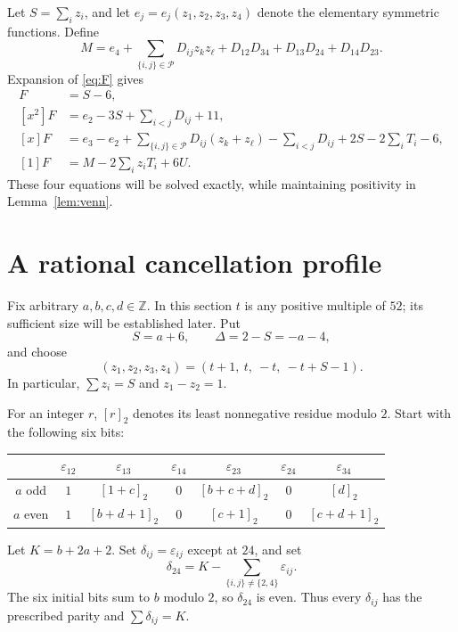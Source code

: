\documentclass[11pt,a4paper]{article}
\theoremstyle{definition}
\newcommand{\Z}{\mathbb Z}
\newcommand{\pairs}{\mathcal P}
\newcommand{\bit}[1]{[#1]_2}
\begin{document}
Let $S=\sum_i z_i$, and let $e_j=e_j(z_1,z_2,z_3,z_4)$ denote the
elementary symmetric functions. Define
\begin{equation}\label{eq:M}
 M=e_4+\sum_{\{i,j\}\in\pairs}D_{ij}z_kz_\ell
     +D_{12}D_{34}+D_{13}D_{24}+D_{14}D_{23}.
\end{equation}
Expansion of \eqref{eq:F} gives
\begin{align}
 [x^3]F&=S-6,\label{eq:coef3}\\
 [x^2]F&=e_2-3S+\sum_{i<j}D_{ij}+11,\label{eq:coef2}\\
 [x]F&=e_3-e_2+\sum_{\{i,j\}\in\pairs}D_{ij}(z_k+z_\ell)
       -\sum_{i<j}D_{ij}+2S-2\sum_iT_i-6,\label{eq:coef1}\\
 [1]F&=M-2\sum_i z_iT_i+6U.\label{eq:coef0}
\end{align}
These four equations will be solved exactly, while maintaining positivity
in Lemma~\ref{lem:venn}.

\section{A rational cancellation profile}\label{sec:construction}

Fix arbitrary $a,b,c,d\in\Z$. In this section $t$ is any positive
multiple of $52$; its sufficient size will be established later. Put
\begin{equation}\label{eq:Sdelta}
 S=a+6,\qquad \Delta=2-S=-a-4,
\end{equation}
and choose
\begin{equation}\label{eq:z}
 (z_1,z_2,z_3,z_4)=(t+1,\ t,\ -t,\ -t+S-1).
\end{equation}
In particular, $\sum z_i=S$ and $z_1-z_2=1$.

For an integer $r$, $\bit r$ denotes its least nonnegative residue modulo
$2$. Start with the following six bits:
\begin{center}
\begin{tabular}{c cccccc}
\toprule
 & $\varepsilon_{12}$ & $\varepsilon_{13}$ & $\varepsilon_{14}$
 & $\varepsilon_{23}$ & $\varepsilon_{24}$ & $\varepsilon_{34}$\\
\midrule
$a$ odd & $1$ & $\bit{1+c}$ & $0$ & $\bit{b+c+d}$ & $0$ & $\bit d$\\
$a$ even & $1$ & $\bit{b+d+1}$ & $0$ & $\bit{c+1}$ & $0$ & $\bit{c+d+1}$\\
\bottomrule
\end{tabular}
\end{center}
Let $K=b+2a+2$. Set $\delta_{ij}=\varepsilon_{ij}$ except at $24$, and set
\begin{equation}\label{eq:deltacorrection}
 \delta_{24}=K-\sum_{\{i,j\}\ne\{2,4\}}\varepsilon_{ij}.
\end{equation}
The six initial bits sum to $b$ modulo $2$, so $\delta_{24}$ is even.
Thus every $\delta_{ij}$ has the prescribed parity and
$\sum\delta_{ij}=K$.
\end{document}

